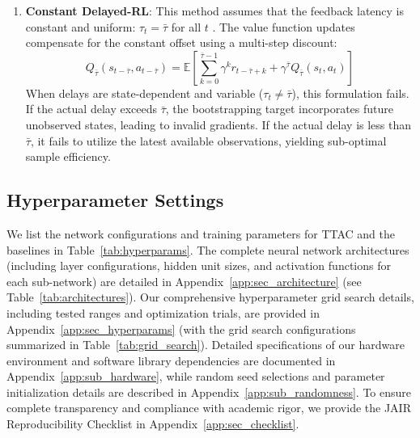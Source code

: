 \documentclass[manuscript, screen, review]{jair}
\begin{document}
\begin{enumerate}
    \item \textbf{Constant Delayed-RL}: This method assumes that the feedback latency is constant and uniform: $\tau_t = \bar{\tau}$ for all $t$ \citep{barth2018distributed}. The value function updates compensate for the constant offset using a multi-step discount:
    \begin{equation}
        Q_{\bar{\tau}}(s_{t-\bar{\tau}}, a_{t-\bar{\tau}}) = \mathbb{E} \left[ \sum_{k=0}^{\bar{\tau}-1} \gamma^k r_{t-\bar{\tau}+k} + \gamma^{\bar{\tau}} Q_{\bar{\tau}}(s_t, a_t) \right]
    \end{equation}
    When delays are state-dependent and variable ($\tau_t \neq \bar{\tau}$), this formulation fails. If the actual delay exceeds $\bar{\tau}$, the bootstrapping target incorporates future unobserved states, leading to invalid gradients. If the actual delay is less than $\bar{\tau}$, it fails to utilize the latest available observations, yielding sub-optimal sample efficiency.
\end{enumerate}

\subsection{Hyperparameter Settings}
We list the network configurations and training parameters for TTAC and the baselines in Table~\ref{tab:hyperparams}. The complete neural network architectures (including layer configurations, hidden unit sizes, and activation functions for each sub-network) are detailed in Appendix~\ref{app:sec_architecture} (see Table~\ref{tab:architectures}). Our comprehensive hyperparameter grid search details, including tested ranges and optimization trials, are provided in Appendix~\ref{app:sec_hyperparams} (with the grid search configurations summarized in Table~\ref{tab:grid_search}). Detailed specifications of our hardware environment and software library dependencies are documented in Appendix~\ref{app:sub_hardware}, while random seed selections and parameter initialization details are described in Appendix~\ref{app:sub_randomness}. To ensure complete transparency and compliance with academic rigor, we provide the JAIR Reproducibility Checklist in Appendix~\ref{app:sec_checklist}.
\end{document}
